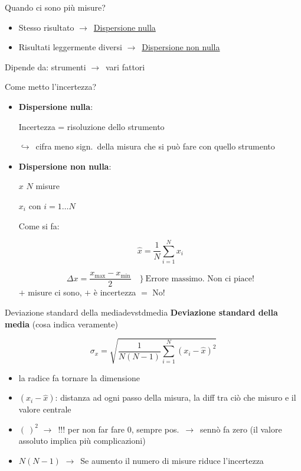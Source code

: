 \documentclass[11pt,a4paper,oneside]{book}
\newcommand{\grigio}[1]{{\color{grigio}#1}}
\newcommand{\fr}{\ensuremath{\rightarrow}}
\newcommand{\giu}{\ensuremath{\hookrightarrow}}
\newcommand{\chiave}[1]{\textbf{#1}}
\begin{document}
Quando ci sono più misure?
\begin{itemize}[label=\fr]
  \item Stesso risultato \fr\ \underline{Dispersione nulla}
  \item Risultati leggermente diversi \fr\ \underline{Dispersione non nulla}
\end{itemize}

Dipende da: strumenti \fr\ vari fattori

Come metto l'incertezza?

\begin{itemize}
  \item \chiave{Dispersione nulla}:

  Incertezza = risoluzione dello strumento

  \giu\ cifra meno sign.\ della misura che si può fare con quello strumento

  \item \chiave{Dispersione non nulla}:

  $x$ \qquad $N$ misure

  $x_i$ con $i = 1 \ldots N$

  Come si fa:
  \begin{formulabox}
  \[
    \hat{x} = \frac{1}{N} \sum_{i=1}^{N} x_i
  \]
  \end{formulabox}
  \[
    \Delta x = \frac{x_{\max} - x_{\min}}{2} \quad \bigr\}\ \text{Errore massimo. Non ci piace!}
  \]
  \grigio{$+$ misure ci sono, $+$ è incertezza $=$ No!}
\end{itemize}

\newpage

\begin{definizione}{Deviazione standard della media}{devstdmedia}
\chiave{Deviazione standard della media} \grigio{(cosa indica veramente)}
\begin{formulabox}
\[
  \sigma_x = \sqrt{\frac{1}{N(N-1)} \sum_{i=1}^{N} (x_i - \hat{x})^2}
\]
\end{formulabox}
\end{definizione}
\begin{itemize}
  \item la radice fa tornare la dimensione
  \item $(x_i - \hat{x})$: distanza ad ogni passo della misura, la diff tra ciò che misuro e il valore centrale
  \item $(\ )^2$ \fr\ !!! per non far fare $0$, sempre pos.\ \fr\ sennò fa zero (il valore assoluto implica più complicazioni)
  \item $N(N-1)$ \fr\ Se aumento il numero di misure riduce l'incertezza
\end{itemize}
\end{document}
